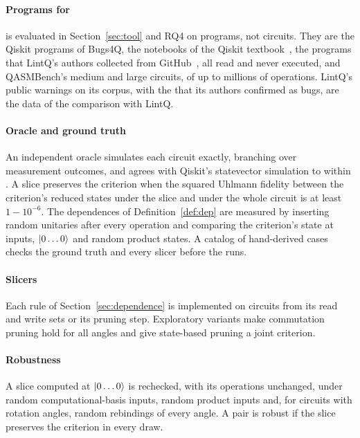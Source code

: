 \paragraph*{Programs for \tool{}}
\tool{} is evaluated in Section~\ref{sec:tool} and RQ4 on programs, not circuits. They are the Qiskit
programs of Bugs4Q, the \numToolTextbookQiskit{} notebooks of the Qiskit textbook~\cite{qiskittextbook}, the
\numScaleSOneFiles{} programs that LintQ's authors collected from GitHub~\cite{paltenghi2024lintq}, all read and
never executed, and QASMBench's medium and large circuits, of up to millions of operations. LintQ's public
warnings on its corpus, with the \numLqTp{} that its authors confirmed as bugs, are the data of the comparison
with LintQ.

\paragraph*{Oracle and ground truth}
An independent oracle simulates each circuit exactly, branching over measurement outcomes, and agrees with
Qiskit's statevector simulation to within \numOracleErr{}. A slice preserves the criterion when the squared Uhlmann fidelity between the
criterion's reduced states under the slice and under the whole circuit is at least $1 - 10^{-6}$. The
dependences of Definition~\ref{def:dep} are measured by inserting \numInfluencePerturbations{} random
unitaries after every operation and comparing the criterion's state at \numInfluenceInputs{} inputs,
$\lvert 0\dots0\rangle$ and random product states. A catalog of \numCatEntries{} hand-derived cases checks the
ground truth and every slicer before the runs.

\paragraph*{Slicers}
Each rule of Section~\ref{sec:dependence} is implemented on circuits from its read and write sets or its
pruning step. Exploratory variants make commutation pruning hold for all angles and give state-based
pruning a joint criterion.

\paragraph*{Robustness}
A slice computed at $\lvert 0\dots0\rangle$ is rechecked, with its operations unchanged, under \numRobDraws{} random
computational-basis inputs, \numRobDraws{} random product inputs and, for circuits with rotation angles,
\numRobDraws{} random rebindings of every angle. A pair is robust if the slice preserves the criterion in
every draw.

